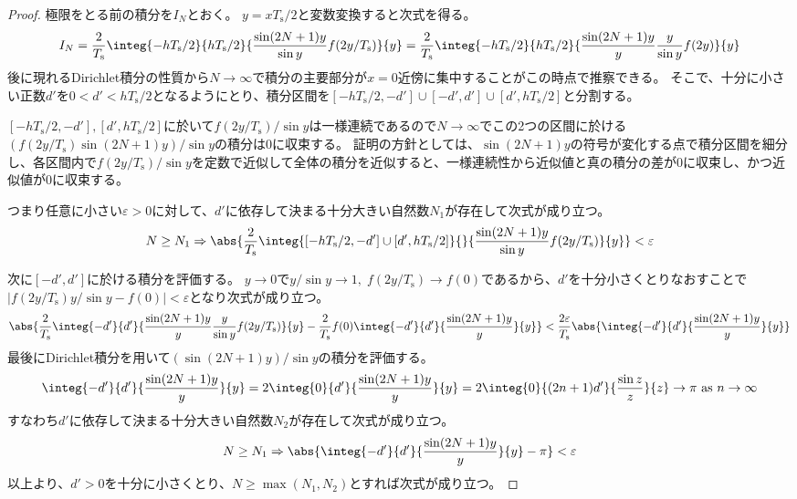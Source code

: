 				\begin{proof}
					\quad\par
					極限をとる前の積分を$I_N$とおく。
					$y = x T_\text{s}/2$と変数変換すると次式を得る。
					\[
						I_N = \frac{2}{T_\text{s}}\integ{-h T_\text{s}/2}{h T_\text{s}/2}{\frac{\sin(2N+1)y}{\sin y}f(2y/T_\text{s})}{y} = \frac{2}{T_\text{s}}\integ{-h T_\text{s}/2}{h T_\text{s}/2}{\frac{\sin(2N+1)y}{y}\frac{y}{\sin y}f(2y)}{y}
					\]
					後に現れるDirichlet積分の性質から$N\to\infty$で積分の主要部分が$x=0$近傍に集中することがこの時点で推察できる。
					そこで、十分に小さい正数$d'$を$0<d'<h T_\text{s}/2$となるようにとり、積分区間を$[-h T_\text{s}/2,-d']\cup[-d',d']\cup[d',h T_\text{s}/2]$と分割する。
					\par
					$[-h T_\text{s}/2,-d'], [d',h T_\text{s}/2]$に於いて$f(2y/T_\text{s})/\sin y$は一様連続であるので$N\to\infty$でこの2つの区間に於ける$(f(2y/T_\text{s})\sin(2N+1)y)/\sin y$の積分は0に収束する。
					証明の方針としては、$\sin(2N+1)y$の符号が変化する点で積分区間を細分し、各区間内で$f(2y/T_\text{s})/\sin y$を定数で近似して全体の積分を近似すると、一様連続性から近似値と真の積分の差が0に収束し、かつ近似値が0に収束する。
					\par
					つまり任意に小さい$\varepsilon>0$に対して、$d'$に依存して決まる十分大きい自然数$N_1$が存在して次式が成り立つ。
					\[
						N\geq N_1 \Rightarrow \abs{\frac{2}{T_\text{s}}\integ{[-h T_\text{s}/2,-d']\cup[d',h T_\text{s}/2]}{}{\frac{\sin(2N+1)y}{\sin y}f(2y/T_\text{s})}{y}}<\varepsilon
					\]
					\par
					次に$[-d',d']$に於ける積分を評価する。
					$y\to 0$で$y/\sin y\to 1,\;f(2y/T_\text{s})\to f(0)$であるから、$d'$を十分小さくとりなおすことで$|f(2y/T_\text{s})y/\sin y - f(0)| < \varepsilon$となり次式が成り立つ。
					\[
						\abs{\frac{2}{T_\text{s}}\integ{-d'}{d'}{\frac{\sin(2N+1)y}{y}\frac{y}{\sin y}f(2y/T_\text{s})}{y} - \frac{2}{T_\text{s}}f(0)\integ{-d'}{d'}{\frac{\sin(2N+1)y}{y}}{y}} < \frac{2\varepsilon}{T_\text{s}}\abs{\integ{-d'}{d'}{\frac{\sin(2N+1)y}{y}}{y}}
					\]
					最後にDirichlet積分を用いて$(\sin(2N+1)y)/\sin y$の積分を評価する。
					\[
						\integ{-d'}{d'}{\frac{\sin(2N+1)y}{y}}{y} = 2\integ{0}{d'}{\frac{\sin(2N+1)y}{y}}{y} = 2\integ{0}{(2n+1)d'}{\frac{\sin z}{z}}{z} \to \pi \text{ as } n\to\infty
					\]
					すなわち$d'$に依存して決まる十分大きい自然数$N_2$が存在して次式が成り立つ。
					\[ N\geq N_1 \Rightarrow \abs{\integ{-d'}{d'}{\frac{\sin(2N+1)y}{y}}{y} - \pi} < \varepsilon \]
					以上より、$d'>0$を十分に小さくとり、$N\geq\max(N_1,N_2)$とすれば次式が成り立つ。

\end{proof}
